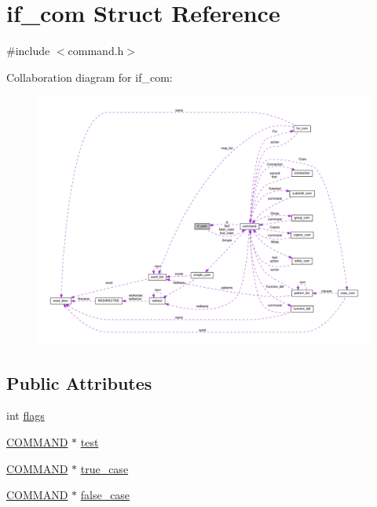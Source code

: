 \hypertarget{structif__com}{}\section{if\+\_\+com Struct Reference}
\label{structif__com}


{\ttfamily \#include $<$command.\+h$>$}



Collaboration diagram for if\+\_\+com\+:
\nopagebreak
\begin{figure}[H]
\begin{center}
\leavevmode
\includegraphics[width=350pt]{structif__com__coll__graph}
\end{center}
\end{figure}
\subsection*{Public Attributes}
\begin{DoxyCompactItemize}
\item 
int \hyperlink{structif__com_a07d76d76b991c3dbabbf5b5c0e123836}{flags}
\item 
\hyperlink{command_8h_a8c41dec142c299806885773c902c0d87}{C\+O\+M\+M\+A\+ND} $\ast$ \hyperlink{structif__com_a28a2dd8a917262a9eaa0c446d1b54fe0}{test}
\item 
\hyperlink{command_8h_a8c41dec142c299806885773c902c0d87}{C\+O\+M\+M\+A\+ND} $\ast$ \hyperlink{structif__com_ae691d759258b18e45dd18591e71dc141}{true\+\_\+case}
\item 
\hyperlink{command_8h_a8c41dec142c299806885773c902c0d87}{C\+O\+M\+M\+A\+ND} $\ast$ \hyperlink{structif__com_ac9f1b317a7c8ff4c750335c571c33a15}{false\+\_\+case}
\end{DoxyCompactItemize}


